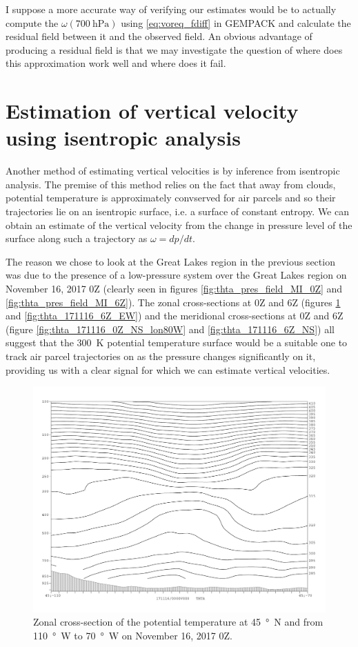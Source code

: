 \documentclass[11pt]{article}
\begin{document}
I suppose a more accurate way of verifying our estimates would be to actually compute the $\omega(\SI{700}{\hecto\Pa})$ using \eqref{eq:voreq_fdiff} in GEMPACK and calculate the residual field between it and the observed field. An obvious advantage of producing a residual field is that we may investigate the question of where does this approximation work well and where does it fail.

\section{Estimation of vertical velocity using isentropic analysis}
Another method of estimating vertical velocities is by inference from isentropic analysis. The premise of this method relies on the fact that away from clouds, potential temperature is approximately convserved for air parcels and so their trajectories lie on an isentropic surface, i.e. a surface of constant entropy. We can obtain an estimate of the vertical velocity from the change in pressure level of the surface along such a trajectory as $\omega = dp/dt$.

The reason we chose to look at the Great Lakes region in the previous section was due to the presence of a low-pressure system over the Great Lakes region on November 16, 2017 0Z (clearly seen in figures \ref{fig:thta_pres_field_MI_0Z} and \ref{fig:thta_pres_field_MI_6Z}). The zonal cross-sections at 0Z and 6Z (figures \ref{fig:thta_171116_0Z_EW} and \ref{fig:thta_171116_6Z_EW}) and the meridional cross-sections at 0Z and 6Z (figure \ref{fig:thta_171116_0Z_NS_lon80W} and \ref{fig:thta_171116_6Z_NS}) all suggest that the \SI{300}{\K} potential temperature surface would be a suitable one to track air parcel trajectories on as the pressure changes significantly on it, providing us with a clear signal for which we can estimate vertical velocities.

\begin{figure}[h!]
  \centering
  \includegraphics[width=\textwidth]{thta_171116_0Z_EW}
  \caption{Zonal cross-section of the potential temperature at \SI{45}{\degree N} and from \SI{110}{\degree W} to \SI{70}{\degree W} on November 16, 2017 0Z.}
  \label{fig:thta_171116_0Z_EW}
\end{figure}
\end{document}
